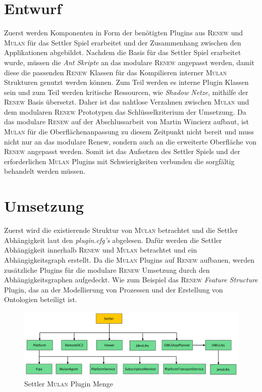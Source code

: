 \section{Entwurf}
	Zuerst werden Komponenten in Form der benötigten Plugins aus \textsc{Renew} und \textsc{Mulan} für das Settler Spiel erarbeitet und der Zusammenhang zwischen den Applikationen abgebildet.\bigbreak
	Nachdem die Basis für das Settler Spiel erarbeitet wurde, müssen die \textit{Ant Skripte} an das modulare \textsc{Renew} angepasst werden, damit diese die passenden \textsc{Renew} Klassen für das Kompilieren interner \textsc{Mulan} Strukturen genutzt werden können. Zum Teil werden es interne Plugin Klassen sein und zum Teil werden kritische Ressourcen, wie \textit{Shadow Netze}, mithilfe der \textsc{Renew} Basis übersetzt. Daher ist das nahtlose Verzahnen zwischen \textsc{Mulan} und dem modularen \textsc{Renew} Prototypen das Schlüsselkriterium der Umsetzung. \bigbreak
	Da das modulare \textsc{Renew} auf der Abschlussarbeit von Martin Wincierz \cite{Wincierz18} aufbaut, ist \textsc{Mulan} für die Oberflächenanpassung zu diesem Zeitpunkt nicht bereit und muss nicht nur an das modulare Renew, sondern auch an die erweiterte Oberfläche von \textsc{Renew} angepasst werden.\newline
	Somit ist das Aufsetzen des Settler Spiels und der erforderlichen \textsc{Mulan} Plugins mit Schwierigkeiten verbunden die sorgfältig behandelt werden müssen. 

\section{Umsetzung}
	Zuerst wird die existierende Struktur von \textsc{Mulan} betrachtet und die Settler Abhängigkeit laut den \textit{plugin.cfg's} abgelesen. Dafür werden die Settler Abhängigkeit innerhalb \textsc{Renew} und \textsc{Mulan} betrachtet und ein Abhängigkeitsgraph erstellt. Da die \textsc{Mulan} Plugins auf \textsc{Renew} aufbauen, werden zusätzliche Plugins für die modulare \textsc{Renew} Umsetzung durch den Abhängigkeitsgraphen aufgedeckt. Wie zum Beispiel das \textsc{Renew} \textit{Feature Structure} Plugin, das an der Modellierung von Prozessen und der Erstellung von Ontologien beteiligt ist. \bigbreak

	\begin{figure}[h!]
	  \centering
	  \includegraphics[width=\textwidth]{material/images/settler-mulan-plugins.pdf}
	  \caption{Settler \textsc{Mulan} Plugin Menge}
	  \label{fig:settler_mulan_plugins}
	\end{figure}

